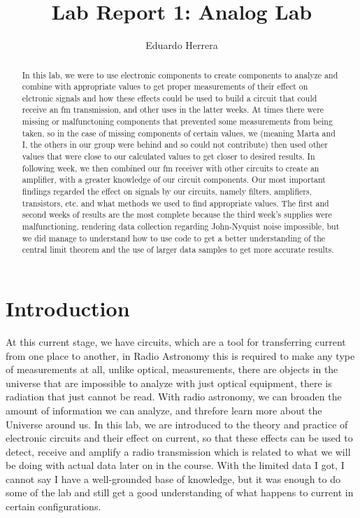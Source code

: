 \documentclass[12 pt]{article}
\begin{document}
\title{Lab Report 1: Analog Lab}
\author{Eduardo Herrera}

\maketitle

\begin{abstract}
In this lab, we were to use electronic components to create
components to analyze and combine with appropriate values to get proper
measurements of their effect on elctronic signals and how these effects
could be used to build a circuit that could receive an fm transmission,
and other uses in the latter weeks. At times there were missing or malfunctoning components
that prevented some measurements from being taken, so in the case of
missing components of certain values, we (meaning Marta
and I, the others
in our group were behind and so could not contribute) then used other
values that were close to our calculated values to get closer to desired
results. In following week, we then combined our fm receiver with other
circuits to create an amplifier, with a greater knowledge of our circuit
components. Our
most important findings regarded the effect on signals by our circuits,
namely filters, amplifiers, transistors,  etc. and what methods we used to find
appropriate values. The first and second weeks of results are the most
complete because the third week's supplies were malfunctioning, rendering
data collection regarding John-Nyquist noise impossible, but we did manage to understand how to use
code to get a better understanding of the central limit theorem and the
use of larger data samples to get more accurate results. 
\end{abstract}

\section{Introduction}
At this current stage, we have circuits,  which are a tool for
transferring current from one place to another, in Radio Astronomy this
is required to make any type of measurements at all, unlike optical,
measurements, there are objects in the universe that are impossible to
analyze with just optical equipment, there is radiation that just cannot
be read. With radio astronomy, we can broaden the amount of information
we can analyze, and threfore learn more about the Universe around us. In
this lab, we are introduced to the theory and practice of electronic
circuits and their effect on current, so that these effects can be used
to detect, receive and amplify a radio transmission which is related to
what we will be doing with actual data later on in the course. With the
limited data I got, I cannot say I have a well-grounded base of
knowledge, but it was enough to do some of the lab and still get a good
understanding of what happens to current in certain configurations. 
\end{document}
